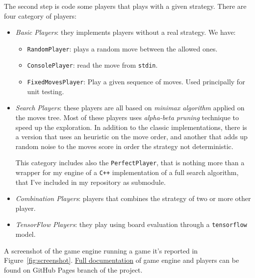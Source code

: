 \documentclass{article}
\newcommand{\ipy}[1]{\texttt{#1}}
\begin{document}
  The second step is code some players that plays with a given strategy. There are four category of players:
  \begin{itemize}
    \item \emph{Basic Players}: they implements players without a real strategy. We have:
      \begin{itemize}
        \item \ipy{RandomPlayer}: plays a random move between the allowed ones.
        \item \ipy{ConsolePlayer}: read the move from \texttt{stdin}.
        \item \ipy{FixedMovesPlayer}: Play a given sequence of moves. Used principally for unit testing.
      \end{itemize}
    \item \emph{Search Players}: these players are all based on \emph{minimax algorithm} applied on the moves tree.
      Most of these players uses \emph{alpha-beta pruning} technique to speed up the exploration. In addition to the classic implementations, there is a version that uses an heuristic on the move order, and another that adds up random noise to the moves score in order the strategy not deterministic.
      
      This category includes also the \ipy{PerfectPlayer}, that is nothing more than a wrapper for my engine of a \texttt{C++} implementation of a full search algorithm\cite{perfectsolvertutotial, perfectsolverimplementation}, that I've included in my repository as submodule. 
    \item \emph{Combination Players}: players that combines the strategy of two or more other player.
    \item \emph{TensorFlow Players}: they play using board evaluation through a \texttt{tensorflow} model.
  \end{itemize}
  
  A screenshot of the game engine running a game it's reported in Figure~\ref{fig:screenshot}.
  \href{https://arn4.github.io/connect4/doc/}{Full documentation} of game engine and players can be found on GitHub Pages branch of the project.
  
\end{document}
